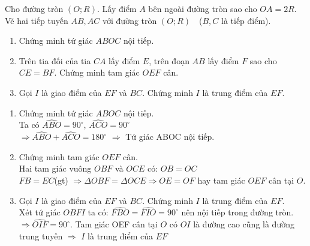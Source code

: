 \begin{ex}%
    Cho đường tròn $(O;R)$. Lấy điểm $A$ bên ngoài đường tròn sao cho $OA=2 R$. Vẽ hai tiếp tuyến $AB, AC$ với đường tròn $(O;R)$~~($B, C$ là tiếp điểm).
    \begin{enumerate}
        \item Chứng minh tứ giác $ABOC$ nội tiếp.
        \item Trên tia đối của tia $CA$ lấy điểm $E$, trên đoạn $AB$ lấy điểm $F$ sao cho $CE=BF$. Chứng minh tam giác $OEF$ cân.
        \item Gọi $I$ là giao điểm của $EF$ và $BC$. Chứng minh $I$ là trung điểm của $EF$.
    \end{enumerate}
\loigiai
    {
    \begin{center}
\end{center}
\begin{enumerate}
\item Chứng minh tứ giác $ABOC$ nội tiếp.\\
Ta có $\widehat{ABO}=90^\circ$,
$\widehat{ACO}=90^\circ$\\
$\Rightarrow \widehat{ABO}+\widehat{ACO}=180^\circ$
$\Rightarrow $ Tứ giác ABOC nội tiếp.
\item Chứng minh tam giác $OEF$ cân.\\
Hai tam giác vuông $OBF$ và $OCE$ có:
$OB=OC$\\
$FB=EC$(gt)
$\Rightarrow \Delta OBF=\Delta OCE\Rightarrow OE=OF$ hay tam giác $OEF$ cân tại $O$.
\item Gọi $I$ là giao điểm của $EF$ và $BC$. Chứng minh $I$ là trung điểm của $EF$.\\
    
 Xét tứ giác $OBFI$ ta có: $\widehat{FBO}=\widehat{FIO}=90^\circ$ nên nội tiếp trong đường tròn. \\
$\Rightarrow \widehat{OIF}=90^\circ$.
Tam giác OEF cân tại $O$ có $OI$ là đường cao cũng là đường trung tuyến
$\Rightarrow $ $I$ là trung điểm của $EF$
\end{enumerate}
    }
\end{ex}

